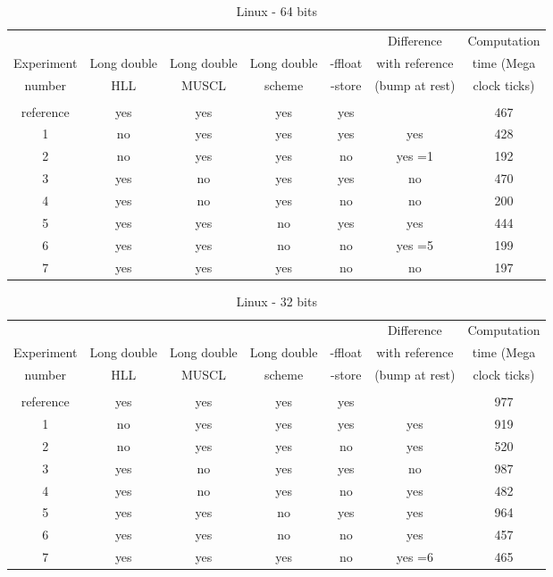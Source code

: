 \documentclass[a4paper, 11pt]{article}
\begin{document}
\begin{table}[htbp]
\begin{tabular}{ccccccc}
\hline
& & & & & Difference& Computation \\
Experiment & Long double & Long double & Long double & -ffloat&with reference& time (Mega\\
number & HLL & MUSCL & scheme & -store&  (bump at rest)  & clock ticks)  \\
& & & & & & \\
\hline
reference & yes & yes & yes &yes &&467\\
1 & no & yes & yes &yes & yes&428\\
2 & no & yes & yes &no & yes =1&192\\
3 & yes & no & yes &yes &no&470\\
4 & yes & no & yes &no &no&200\\
5 & yes & yes & no &yes &yes&444\\
6 & yes & yes & no &no &yes =5&199\\
7 & yes & yes & yes &no &no&197\\
\hline
\end{tabular}
\caption{Linux - 64 bits}
\label{Mac}
\end{table}

\begin{table}[htbp]
\begin{tabular}{ccccccc}
\hline
& & & & & Difference& Computation \\
Experiment & Long double & Long double & Long double & -ffloat&with reference& time (Mega\\
number & HLL & MUSCL & scheme & -store&  (bump at rest)  & clock ticks)  \\
& & & & & & \\
\hline
reference & yes & yes & yes &yes && 977\\
1 & no & yes & yes &yes & yes& 919\\
2 & no & yes & yes &no & yes& 520\\
3 & yes & no & yes &yes &no&987\\
4 & yes & no & yes &no &yes& 482\\
5 & yes & yes & no &yes &yes& 964\\
6 & yes & yes & no &no &yes&457\\
7 & yes & yes & yes &no &yes =6& 465\\
\hline
\end{tabular}
\caption{Linux - 32 bits}
\label{Linux}
\end{table}
\end{document}
